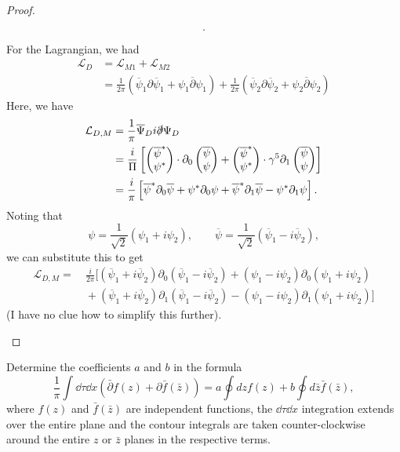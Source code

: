 \begin{proof}
\begin{parts}
\[	.\] 
\item For the Lagrangian, we had
	\begin{align*}
		\mathcal{L}_D &= \mathcal{L}_{M 1}+\mathcal{L}_{M 2}\\
		&= \frac{1}{2\pi}(\overline{\psi}_1\partial \overline{\psi}_1+\psi_1 \overline{\partial}\psi_1)+\frac{1}{2\pi}(\overline{\psi}_2\partial \overline{\psi}_2 + \psi_2 \overline{\partial}\psi_2)
	\end{align*}
	Here, we have
	\begin{align*}
		\mathcal{L}_{D,M} &= \frac{1}{\pi}\overline{\Psi}_D i\slashed{\partial}\Psi_D \\
&= \frac{i}{\Pi}\left[ \begin{pmatrix} \overline{\psi}^*\\ \psi^* \end{pmatrix} \cdot \partial_0 \begin{pmatrix} \overline{\psi}\\ \psi \end{pmatrix} + \begin{pmatrix} \overline{\psi}^*  \\ \psi^* \end{pmatrix} \cdot \gamma^5\partial_1 \begin{pmatrix} \overline{\psi} \\ \psi \end{pmatrix}  \right]  \\
&= \frac{i}{\pi}\left[ \overline{\psi}^* \partial_0 \overline{\psi}+ \psi^* \partial_0 \psi + \overline{\psi}^*\partial_1 \overline{\psi}- \psi^* \partial_1 \psi \right]. 
	\end{align*}
	Noting that
	\[
	\psi=\frac{1}{\sqrt{2} }( \psi_1+i\psi_2), \qquad \overline{\psi}=\frac{1}{\sqrt{2} }(\overline{\psi}_1 - i \overline{\psi}_2)
	,\] 
	we can substitute this to get
	\begin{align*}
		\mathcal{L}_{D,M} =&~  \frac{i}{2\pi}[(\overline{\psi}_1+i \overline{\psi}_2) \partial_0 (\overline{\psi}_1 - i \overline{\psi}_2)+ (\psi_1-i\psi_2)\partial_0 (\psi_1+i\psi_2) \\
				   &~+ (\overline{\psi}_1+i \overline{\psi}_2)\partial_1 (\overline{\psi}_1 - i \overline{\psi}_2) -(\psi_1-i\psi_2)\partial_1(\psi_1+i\psi_2)]
	\end{align*}
	(I have no clue how to simplify this further).\qedhere
	\end{parts}
\end{proof}	
	\begin{Problem}
			Determine the coefficients $a$ and $b$ in the formula
	\[
	\frac{1}{\pi} \int \dd{\tau} \dd{x} \left( \bar{\partial} f(z) + \partial \bar{f}(\bar{z}) \right) = a \oint dz f(z) + b \oint d\bar{z} \bar{f}(\bar{z}),
	\]
	where $f(z)$ and $\bar{f}(\bar{z})$ are independent functions, the $\dd{\tau} \dd{x}$ integration extends over the entire plane and the contour integrals are taken counter-clockwise around the entire $z$ or $\bar{z}$ planes in the respective terms.
\end{Problem}
